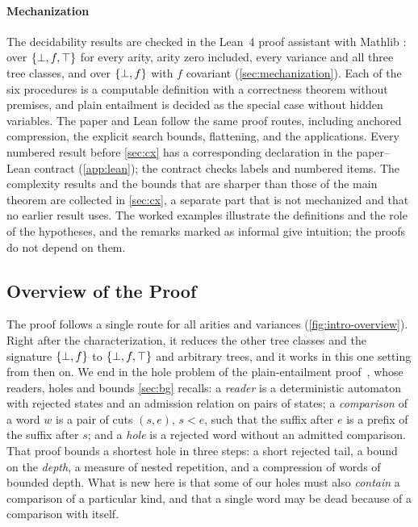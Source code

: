 \paragraph{Mechanization}
The decidability results are checked in the Lean~4 proof assistant
\citep{MouraUllrich21} with Mathlib \citep{Mathlib20}: over $\{\bot,f,\top\}$ for every
arity, arity zero included, every variance and all three tree classes, and
over $\{\bot,f\}$ with $f$ covariant (\cref{sec:mechanization}). Each of the six
procedures is a computable definition with a correctness theorem without
premises, and plain entailment is decided as the special case without hidden
variables. The paper and Lean follow the same proof routes, including anchored
compression, the explicit search bounds, flattening, and the applications.
Every numbered result before \cref{sec:cx} has a corresponding declaration
in the paper--Lean contract (\cref{app:lean}); the contract checks labels and
numbered items. The complexity results and the bounds that are
sharper than those of the main theorem are collected in \cref{sec:cx}, a
separate part that is not mechanized and that no earlier result uses.
The worked examples illustrate the definitions and the role of the hypotheses,
and the remarks marked as informal give intuition; the proofs do not depend on
them.

\subsection{Overview of the Proof}\label{sec:intro-overview}

The proof follows a single route for all arities and variances
(\cref{fig:intro-overview}). Right after the characterization, it reduces the
other tree classes and the signature $\{\bot,f\}$ to $\{\bot,f,\top\}$ and arbitrary trees, and
it works in this one setting from then on. We end
in the hole problem of the plain-entailment proof~\citep{Zhao26}, whose readers, holes and bounds
\cref{sec:bg} recalls: a \emph{reader} is a deterministic automaton with
rejected states and an admission relation on pairs of states; a
\emph{comparison} of a word $w$ is a pair of cuts $(s,e)$, $s<e$, such that the
suffix after $e$ is a prefix of the suffix after $s$; and a \emph{hole} is a
rejected word without an admitted comparison. That proof bounds a
shortest hole in three steps: a short rejected tail, a bound on the
\emph{depth}, a measure of nested repetition, and a compression of words of
bounded depth. What is new here is that some of our holes must also
\emph{contain} a comparison of a particular kind, and that a single word may
be dead because of a comparison with itself.

